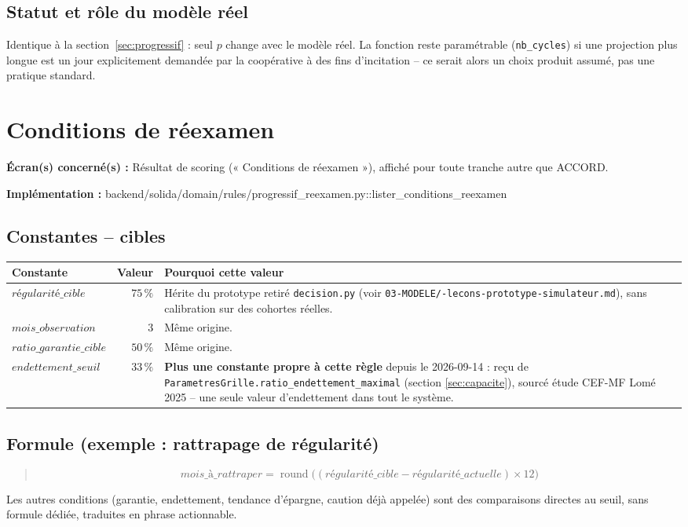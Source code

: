 \documentclass[11pt,a4paper]{article}
\newcommand{\brk}{\allowbreak}
\newcommand{\ecran}[1]{\noindent\textbf{Écran(s) concerné(s) :} #1\par}
\newcommand{\fichier}[1]{\noindent\textbf{Implémentation :} \tiny\ttfamily#1\normalfont\normalsize\par}
\newenvironment{formule}{\begin{quote}}{\end{quote}}
\begin{document}
\subsection*{Statut et rôle du modèle réel}
Identique à la section~\ref{sec:progressif} : seul $p$ change avec le modèle réel. La fonction
reste paramétrable (\texttt{nb\_cycles}) si une projection plus longue est un jour explicitement
demandée par la coopérative à des fins d'incitation -- ce serait alors un choix produit assumé,
pas une pratique standard.

\newpage

\section{Conditions de réexamen}
\label{sec:reexamen}

\ecran{Résultat de scoring (« Conditions de réexamen »), affiché pour toute tranche autre que
ACCORD.}
\fichier{backend/\brk solida/\brk domain/\brk rules/\brk progressif\_reexamen.py::\brk{}lister\_conditions\_reexamen}

\subsection*{Constantes -- cibles}

\begin{tabular}{@{}L{5.5cm}rL{4.6cm}@{}}
\toprule
Constante & Valeur & Pourquoi cette valeur \\
\midrule
$\mathit{régularité\_cible}$ & $75\,\%$ & Hérite du prototype retiré \texttt{decision.py}
  (voir \texttt{03-MODELE/\brk 09-lecons-\brk prototype-\brk simulateur.md}), sans calibration sur
  des cohortes réelles. \\
$\mathit{mois\_observation}$ & $3$ & Même origine. \\
$\mathit{ratio\_garantie\_cible}$ & $50\,\%$ & Même origine. \\
$\mathit{endettement\_seuil}$ & $33\,\%$ & \textbf{Plus une constante propre à cette règle} depuis
  le 2026-09-14 : reçu de \texttt{ParametresGrille.ratio\_endettement\_maximal} (section
  \ref{sec:capacite}), sourcé étude CEF-MF Lomé 2025 -- une seule valeur d'endettement dans tout
  le système. \\
\bottomrule
\end{tabular}

\subsection*{Formule (exemple : rattrapage de régularité)}
\begin{formule}
\[
\mathit{mois\_à\_rattraper} = \operatorname{round}\big((\mathit{régularité\_cible} - \mathit{régularité\_actuelle}) \times 12\big)
\]
\end{formule}
Les autres conditions (garantie, endettement, tendance d'épargne, caution déjà appelée) sont des
comparaisons directes au seuil, sans formule dédiée, traduites en phrase actionnable.
\end{document}
